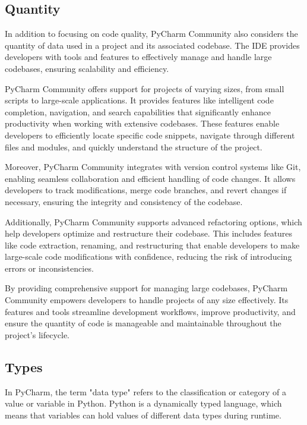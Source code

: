 \subsection{Quantity}

In addition to focusing on code quality, PyCharm Community also considers the quantity of data used in a project and its associated codebase. The IDE provides developers with tools and features to effectively manage and handle large codebases, ensuring scalability and efficiency.

PyCharm Community offers support for projects of varying sizes, from small scripts to large-scale applications. It provides features like intelligent code completion, navigation, and search capabilities that significantly enhance productivity when working with extensive codebases. These features enable developers to efficiently locate specific code snippets, navigate through different files and modules, and quickly understand the structure of the project.

Moreover, PyCharm Community integrates with version control systems like Git, enabling seamless collaboration and efficient handling of code changes. It allows developers to track modifications, merge code branches, and revert changes if necessary, ensuring the integrity and consistency of the codebase.

Additionally, PyCharm Community supports advanced refactoring options, which help developers optimize and restructure their codebase. This includes features like code extraction, renaming, and restructuring that enable developers to make large-scale code modifications with confidence, reducing the risk of introducing errors or inconsistencies.

By providing comprehensive support for managing large codebases, PyCharm Community empowers developers to handle projects of any size effectively. Its features and tools streamline development workflows, improve productivity, and ensure the quantity of code is manageable and maintainable throughout the project's lifecycle.

\subsection{Types}

In PyCharm, the term "data type" refers to the classification or category of a value or variable in Python. Python is a dynamically typed language, which means that variables can hold values of different data types during runtime.

